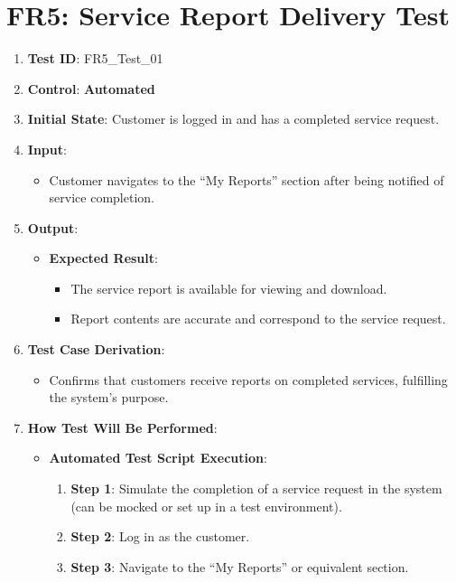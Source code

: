 \documentclass[12pt, titlepage]{article}
\begin{document}
\section*{FR5: Service Report Delivery Test}

\begin{enumerate}
    \item \textbf{Test ID}: FR5\_Test\_01
    \item \textbf{Control}: \textbf{Automated}
    \item \textbf{Initial State}: Customer is logged in and has a completed service request.
    \item \textbf{Input}:
    \begin{itemize}
        \item Customer navigates to the ``My Reports'' section after being notified of service completion.
    \end{itemize}
    \item \textbf{Output}:
    \begin{itemize}
        \item \textbf{Expected Result}:
        \begin{itemize}
            \item The service report is available for viewing and download.
            \item Report contents are accurate and correspond to the service request.
        \end{itemize}
    \end{itemize}
    \item \textbf{Test Case Derivation}:
    \begin{itemize}
        \item Confirms that customers receive reports on completed services, fulfilling the system’s purpose.
    \end{itemize}
    \item \textbf{How Test Will Be Performed}:
    \begin{itemize}
        \item \textbf{Automated Test Script Execution}:
        \begin{enumerate}
            \item \textbf{Step 1}: Simulate the completion of a service request in the system (can be mocked or set up in a test environment).
            \item \textbf{Step 2}: Log in as the customer.
            \item \textbf{Step 3}: Navigate to the ``My Reports'' or equivalent section.

\end{enumerate}
\end{itemize}
\end{enumerate}
\end{document}

